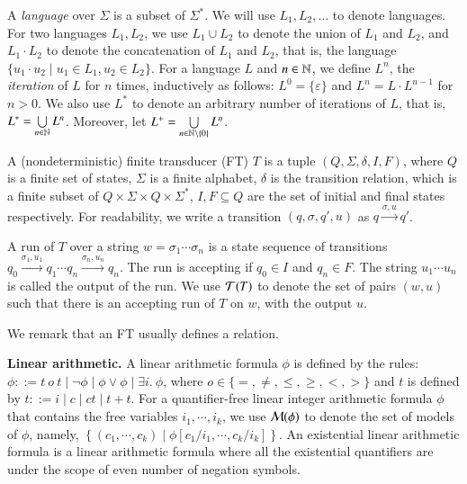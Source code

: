 A \emph{language} over $\Sigma$ is a subset of $\Sigma^*$. We will use $L_1, L_2, \dots$ to denote languages. For two languages $L_1, L_2$, we use $L_1 \cup L_2$ to denote the union of $L_1$ and $L_2$, and $L_1 \cdot L_2$ to denote the concatenation of $L_1$ and $L_2$, that is, the language $\{u_1 \cdot u_2 \mid u_1 \in L_1, u_2 \in L_2\}$. For a language $L$ and $n \in \mathbb{N}$, we define $L^n$, the \emph{iteration} of $L$ for $n$ times, inductively as follows: $L^0=\{\varepsilon\}$ and $L^{n} =L \cdot L^{n-1}$ for $n > 0$. We also use $L^*$ to denote an arbitrary number of iterations of $L$, that is, $L^* = \bigcup \limits_{n \in \mathbb{N}} L^n$. Moreover, let $L^+ = \bigcup \limits_{n \in \mathbb{N} \setminus \{0\}} L^n$.

A (nondeterministic) finite transducer (FT) $T$ is a tuple $(Q, \Sigma, \delta, I, F)$, where $Q$ is a finite set of states, $\Sigma$ is a finite alphabet, $\delta$ is the transition relation, which is a finite subset of $Q \times \Sigma \times Q \times \Sigma^*$, $I,F \subseteq Q$ are the set of initial and final states respectively. For readability, we write a transition $(q, \sigma, q', u)$ as $q \xrightarrow{\sigma, u} q'$. 

A run of $T$ over a string $w=\sigma_1 \cdots \sigma_n$ is a state sequence of transitions $q_0 \xrightarrow{\sigma_1, u_1} q_1 \cdots q_n \xrightarrow{\sigma_n, u_n} q_n$. The run is accepting if $q_0 \in I$ and $q_n \in F$. The string $u_1 \cdots u_n$ is called the output of the run. We use $\mathcal{T}(T)$ to denote the set of pairs $(w, u)$ such that there is an accepting run of $T$ on $w$, with the output $u$.

We remark that an FT usually defines a relation.

\noindent\textbf{Linear arithmetic.}  A linear arithmetic formula $\phi$ is defined by the rules: $\phi::= t \ o \ t \mid \neg \phi \mid \phi \vee \phi \mid \exists i.\ \phi$, where $o \in \{=, \neq, \le, \ge, <, >\}$ and $t$ is defined by  $t::= i \mid c \mid ct \mid t + t $.  
For a quantifier-free linear integer arithmetic formula $\phi$ that contains the free variables $i_1, \cdots, i_k$, we use $\mathcal{M}(\phi)$ to denote the set of models of $\phi$, namely, $\left\{(c_1, \cdots ,c_k) \mid \phi[c_1/i_1, \cdots, c_k/i_k]\right\}$. An existential linear arithmetic formula is a linear arithmetic formula where all the existential quantifiers are under the scope of even number of negation symbols.
